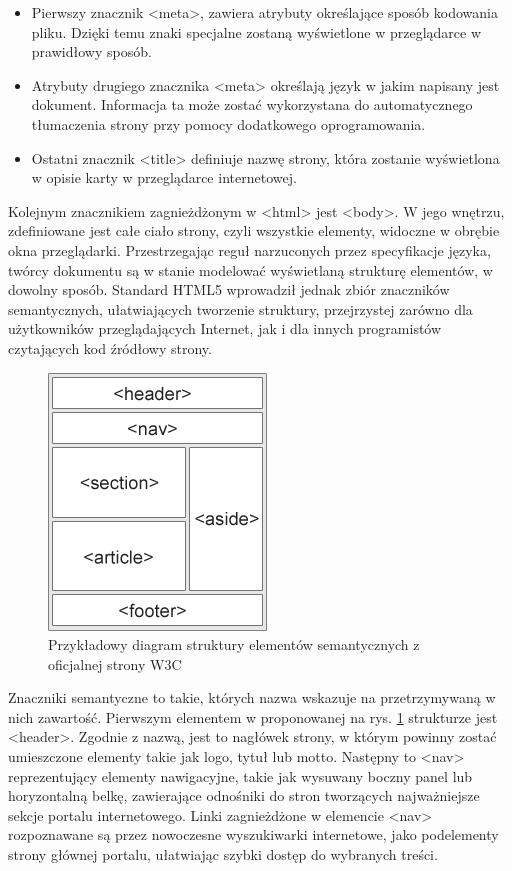 \begin{itemize}
    \item Pierwszy znacznik <meta>, zawiera atrybuty określające sposób kodowania pliku. Dzięki temu znaki specjalne zostaną wyświetlone w przeglądarce w prawidłowy sposób.
    \item Atrybuty drugiego znacznika <meta> określają język w jakim napisany jest dokument. Informacja ta może zostać wykorzystana do automatycznego tłumaczenia strony przy pomocy dodatkowego oprogramowania.
    \item Ostatni znacznik <title> definiuje nazwę strony, która zostanie wyświetlona w opisie karty w przeglądarce internetowej.
\end{itemize}

Kolejnym znacznikiem zagnieżdżonym w <html> jest <body>. W jego wnętrzu, zdefiniowane jest całe ciało strony, czyli wszystkie elementy, widoczne w obrębie okna przeglądarki. Przestrzegając reguł narzuconych przez specyfikacje języka, twórcy dokumentu są w stanie modelować wyświetlaną strukturę elementów, w dowolny sposób. Standard HTML5 wprowadził jednak zbiór znaczników semantycznych, ułatwiających tworzenie struktury, przejrzystej zarówno dla użytkowników przeglądających Internet, jak i dla innych programistów czytających kod źródłowy strony.

\begin{figure}[!htbp] 
    \centering
    \includegraphics{img/chapter3/html.semantic-elements.png}
    \caption{Przykładowy diagram struktury elementów semantycznych z oficjalnej strony W3C}
    \label{fig:html.semantic-elements}
\end{figure}

Znaczniki semantyczne to takie, których nazwa wskazuje na przetrzymywaną w nich zawartość. Pierwszym elementem w proponowanej na rys. \ref{fig:html.semantic-elements} strukturze jest <header>. Zgodnie z nazwą, jest to nagłówek strony, w którym powinny zostać umieszczone elementy takie jak logo, tytuł lub motto. Następny to <nav> reprezentujący elementy nawigacyjne, takie jak wysuwany boczny panel lub horyzontalną belkę, zawierające odnośniki do stron tworzących najważniejsze sekcje portalu internetowego. Linki zagnieżdżone w elemencie <nav> rozpoznawane są przez nowoczesne wyszukiwarki internetowe, jako podelementy strony głównej portalu, ułatwiając szybki dostęp do wybranych treści.

